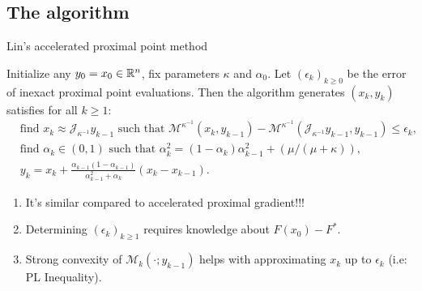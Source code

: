\documentclass[11pt]{beamer}
\begin{document}
        \subsection{The algorithm}
            \begin{frame}{Lin's accelerated proximal point method}
                \begin{definition}
                    Initialize any $y_0 = x_0 \in \mathbb R^n$, fix parameters $\kappa$ and $\alpha_0$. 
                    Let $(\epsilon_k)_{k \ge 0}$ be the error of inexact proximal point evaluations. 
                    Then the algorithm generates $(x_k, y_k)$ satisfies for all $k \ge 1$: 
                    {\small
                    \begin{align*}
                        & \text{find } x_k \approx \mathcal J_{\kappa^{-1}} y_{k - 1} \text{ such that } \mathcal M^{\kappa^{-1}}(x_k, y_{k - 1}) - \mathcal M^{\kappa^{-1}}(\mathcal J_{\kappa^{-1}}y_{k - 1}, y_{k - 1}) \le \epsilon_k, 
                        \\
                        & \text{find } \alpha_k \in (0, 1) \text{ such that } \alpha_k^2 = (1 - \alpha_k)\alpha_{k - 1}^2 + (\mu/(\mu + \kappa)), 
                        \\
                        & 
                        y_{k} = x_k + \frac{\alpha_{k - 1}(1 - \alpha_{k - 1})}{\alpha_{k - 1}^2 + \alpha_k}(x_k - x_{k - 1}). 
                    \end{align*}
                    }
                \end{definition}
                \pause
                \begin{enumerate}
                    \item It's similar compared to accelerated proximal gradient!!!
                    \item Determining $(\epsilon_k)_{k \ge 1}$ requires knowledge about $F(x_0) - F^*$. 
                    \item Strong convexity of $\mathcal M_k(\cdot; y_{k - 1})$ helps with approximating $x_k$ up to $\epsilon_k$ (i.e: PL Inequality). 
                \end{enumerate}
            \end{frame}
\end{document}
